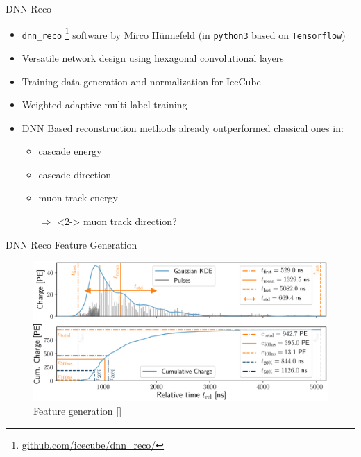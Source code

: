 \begin{frame}{DNN Reco}
    \begin{itemize}
        \item \texttt{dnn\_reco} \footnote{\href{https://github.com/icecube/dnn_reco/}{github.com/icecube/dnn\_reco/}}
              software by Mirco Hünnefeld (in \texttt{python3} based on \texttt{Tensorflow})
        \item Versatile network design using hexagonal convolutional layers
        \item Training data generation and normalization for IceCube
        \item Weighted adaptive multi-label training
        \item DNN Based reconstruction methods already outperformed classical ones in:
              \begin{itemize}
                  \item cascade energy
                  \item cascade direction
                  \item muon track energy
                        \item[\color{mLightBrown}$\Rightarrow$]<2-> {\color{mLightBrown} muon track direction?}
              \end{itemize}
    \end{itemize}
\end{frame}
\begin{frame}{DNN Reco Feature Generation}
    \begin{figure}
        \centering
        \includegraphics[width=.8\textwidth]{media/feature_generation}
        \caption*{Feature generation []}
    \end{figure}
\end{frame}
